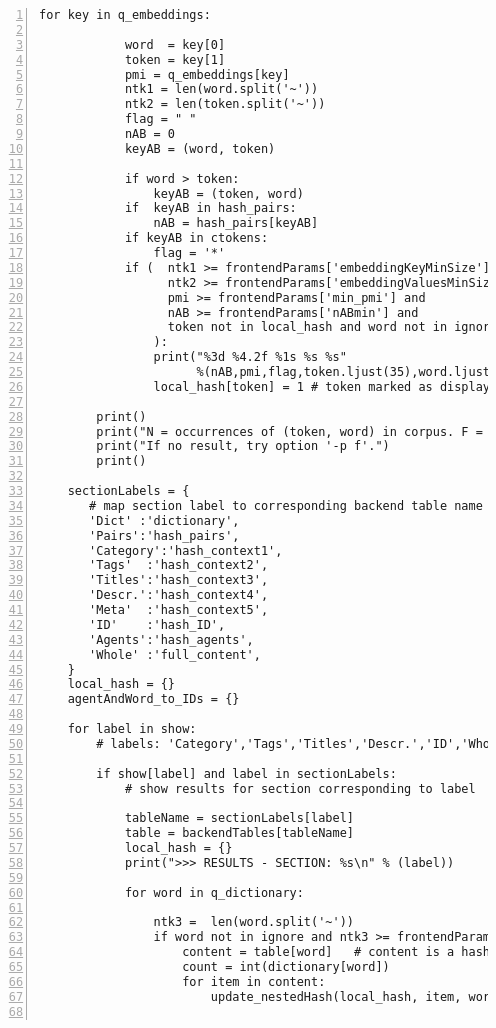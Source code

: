 \documentclass[10pt]{article}
\begin{document}
{\begin{lstlisting}[numbers=left,basicstyle=\ttfamily\footnotesize]
        for key in q_embeddings:

            word  = key[0]
            token = key[1]
            pmi = q_embeddings[key]
            ntk1 = len(word.split('~'))
            ntk2 = len(token.split('~'))
            flag = " "
            nAB = 0
            keyAB = (word, token)

            if word > token:
                keyAB = (token, word)
            if  keyAB in hash_pairs:
                nAB = hash_pairs[keyAB]
            if keyAB in ctokens:
                flag = '*'
            if (  ntk1 >= frontendParams['embeddingKeyMinSize'] and 
                  ntk2 >= frontendParams['embeddingValuesMinSize'] and
                  pmi >= frontendParams['min_pmi'] and 
                  nAB >= frontendParams['nABmin'] and
                  token not in local_hash and word not in ignore
                ): 
                print("%3d %4.2f %1s %s %s" 
                      %(nAB,pmi,flag,token.ljust(35),word.ljust(35)))
                local_hash[token] = 1 # token marked as displayed, won't be shown again

        print()
        print("N = occurrences of (token, word) in corpus. F = * if contextual pair.")
        print("If no result, try option '-p f'.")
        print()

    sectionLabels = { 
       # map section label to corresponding backend table name
       'Dict' :'dictionary', 
       'Pairs':'hash_pairs', 
       'Category':'hash_context1', 
       'Tags'  :'hash_context2', 
       'Titles':'hash_context3', 
       'Descr.':'hash_context4', 
       'Meta'  :'hash_context5',
       'ID'    :'hash_ID',
       'Agents':'hash_agents',
       'Whole' :'full_content',
    }
    local_hash = {}
    agentAndWord_to_IDs = {}

    for label in show:
        # labels: 'Category','Tags','Titles','Descr.','ID','Whole','Agents','Embeddings'

        if show[label] and label in sectionLabels: 
            # show results for section corresponding to label 

            tableName = sectionLabels[label]
            table = backendTables[tableName]
            local_hash = {}
            print(">>> RESULTS - SECTION: %s\n" % (label))

            for word in q_dictionary:  

                ntk3 =  len(word.split('~'))
                if word not in ignore and ntk3 >= frontendParams['ContextMultitokenMinSize']: 
                    content = table[word]   # content is a hash
                    count = int(dictionary[word])
                    for item in content:
                        update_nestedHash(local_hash, item, word, count)


\end{lstlisting}}
\end{document}
